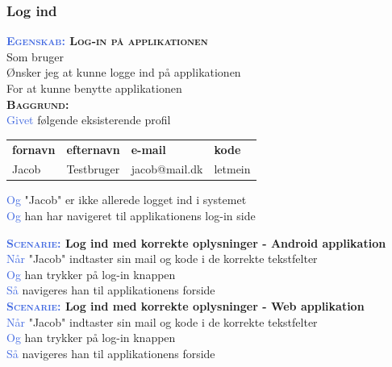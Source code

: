 \subsubsection{Log ind}
\textbf{\textsc{\textcolor{RoyalBlue} {Egenskab:} Log-in på applikationen}} \\
Som bruger\\
Ønsker jeg at kunne logge ind på applikationen\\
For at kunne benytte applikationen\\

\textbf{\textsc{\color{RoyalBlue}Baggrund:}}\\
\textcolor{RoyalBlue}{Givet} følgende eksisterende profil\\
\begin{tabular}{| l | l | l | l |}
	\textbf{fornavn} & \textbf{efternavn} & \textbf{e-mail} & \textbf{kode} \\
	Jacob & Testbruger & jacob@mail.dk & letmein\\
\end{tabular}
\newline \newline
\textcolor{RoyalBlue}{Og} "Jacob" er ikke allerede logget ind i systemet\\
\textcolor{RoyalBlue}{Og} han har navigeret til applikationens log-in side\\

\clearpage

\textbf{\textsc{\textcolor{RoyalBlue}{Scenarie:}} Log ind med korrekte oplysninger - Android applikation}\\
\textcolor{RoyalBlue}{Når} "Jacob" indtaster sin mail og kode i de korrekte tekstfelter\\
\textcolor{RoyalBlue}{Og} han trykker på log-in knappen\\
\textcolor{RoyalBlue}{Så} navigeres han til applikationens forside\\

\textbf{\textsc{\textcolor{RoyalBlue}{Scenarie:}} Log ind med korrekte oplysninger - Web applikation}\\
\textcolor{RoyalBlue}{Når} "Jacob" indtaster sin mail og kode i de korrekte tekstfelter\\
\textcolor{RoyalBlue}{Og} han trykker på log-in knappen\\
\textcolor{RoyalBlue}{Så} navigeres han til applikationens forside\\

